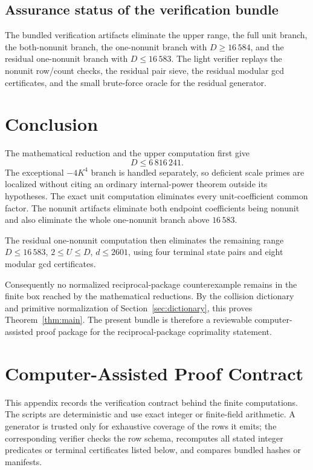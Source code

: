 \documentclass[11pt]{article}
\numberwithin{equation}{section}
\theoremstyle{definition}
\begin{document}
\subsection*{Assurance status of the verification bundle}

The bundled verification artifacts eliminate the upper range, the full
unit branch, the both-nonunit branch, the one-nonunit branch with
\(D\geq16\,584\), and the residual one-nonunit branch with
\(D\leq16\,583\).  The light verifier replays the nonunit row/count checks,
the residual pair sieve, the residual modular gcd certificates, and the small
brute-force oracle for the residual generator.

\section*{Conclusion}

The mathematical reduction and the upper computation first give
\[
 D\leq6\,816\,241.
\]
The exceptional \(-4K^4\) branch is handled separately, so deficient scale
primes are localized without citing an ordinary internal-power theorem outside
its hypotheses.  The exact unit computation eliminates every unit-coefficient
common factor.  The nonunit artifacts eliminate both endpoint coefficients
being nonunit and also eliminate the whole one-nonunit branch above
\(16\,583\).

The residual one-nonunit computation then eliminates the remaining
range \(D\leq16\,583\), \(2\leq U\leq D\), \(d\leq2601\), using four terminal
state pairs and eight modular gcd certificates.

Consequently no normalized reciprocal-package counterexample remains in the
finite box reached by the mathematical reductions.  By the collision
dictionary and primitive normalization of Section~\ref{sec:dictionary}, this
proves Theorem~\ref{thm:main}.  The present bundle is therefore a reviewable
computer-assisted proof package for the reciprocal-package coprimality
statement.

\appendix

\section{Computer-Assisted Proof Contract}
\label{app:proofcontract}

This appendix records the verification contract behind the finite computations.
The scripts are deterministic and use exact integer or finite-field
arithmetic.  A generator is trusted only for exhaustive coverage of the rows it
emits; the corresponding verifier checks the row schema, recomputes all stated
integer predicates or terminal certificates listed below, and compares bundled
hashes or manifests.
\end{document}

